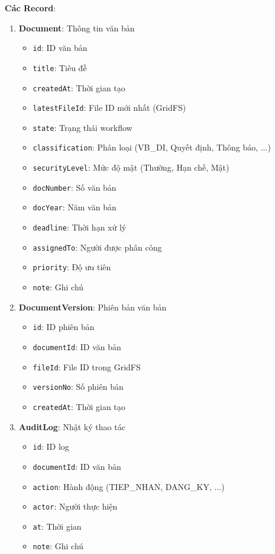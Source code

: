 \documentclass[12pt,a4paper]{article}
\begin{document}
\textbf{Các Record}:

\begin{enumerate}
    \item \textbf{Document}: Thông tin văn bản
    \begin{itemize}
        \item \texttt{id}: ID văn bản
        \item \texttt{title}: Tiêu đề
        \item \texttt{createdAt}: Thời gian tạo
        \item \texttt{latestFileId}: File ID mới nhất (GridFS)
        \item \texttt{state}: Trạng thái workflow
        \item \texttt{classification}: Phân loại (VB\_DI, Quyết định, Thông báo, ...)
        \item \texttt{securityLevel}: Mức độ mật (Thường, Hạn chế, Mật)
        \item \texttt{docNumber}: Số văn bản
        \item \texttt{docYear}: Năm văn bản
        \item \texttt{deadline}: Thời hạn xử lý
        \item \texttt{assignedTo}: Người được phân công
        \item \texttt{priority}: Độ ưu tiên
        \item \texttt{note}: Ghi chú
    \end{itemize}
    
    \item \textbf{DocumentVersion}: Phiên bản văn bản
    \begin{itemize}
        \item \texttt{id}: ID phiên bản
        \item \texttt{documentId}: ID văn bản
        \item \texttt{fileId}: File ID trong GridFS
        \item \texttt{versionNo}: Số phiên bản
        \item \texttt{createdAt}: Thời gian tạo
    \end{itemize}
    
    \item \textbf{AuditLog}: Nhật ký thao tác
    \begin{itemize}
        \item \texttt{id}: ID log
        \item \texttt{documentId}: ID văn bản
        \item \texttt{action}: Hành động (TIEP\_NHAN, DANG\_KY, ...)
        \item \texttt{actor}: Người thực hiện
        \item \texttt{at}: Thời gian
        \item \texttt{note}: Ghi chú
    \end{itemize}
    

\end{enumerate}
\end{document}
